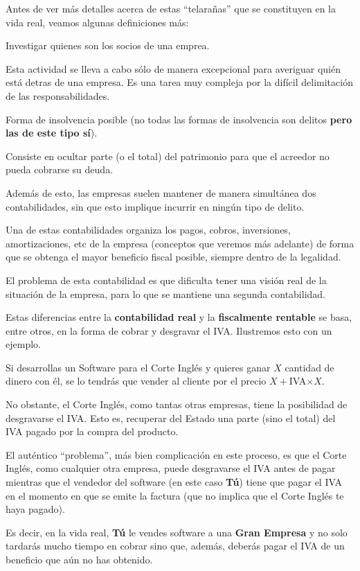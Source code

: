 \documentclass[nochap,palatino,shortheader]{apuntes}
\begin{document}
Antes de ver más detalles acerca de estas ``telarañas'' que se constituyen en la vida real, veamos algunas definiciones más:

\begin{defn}
Investigar quienes son los socios de una emprea.

Esta actividad se lleva a cabo sólo de manera excepcional para averiguar quién está detras de una empresa. Es una tarea muy compleja por la difícil delimitación de las responsabilidades.
\end{defn}

\begin{defn}
Forma de insolvencia posible (no todas las formas de insolvencia son delitos \textbf{pero las de este tipo sí}).

Consiste en ocultar parte (o el total) del patrimonio para que el acreedor no pueda cobrarse su deuda.
\end{defn}

Además de esto, las empresas suelen mantener de manera simultánea dos contabilidades, sin que esto implique incurrir en ningún tipo de delito.

Una de estas contabilidades organiza los pagos, cobros, inversiones, amortizaciones, etc de la empresa (conceptos que veremos más adelante) de forma que se obtenga el mayor beneficio fiscal posible, siempre dentro de la legalidad.

El problema de esta contabilidad es que dificulta tener una visión real de la situación de la empresa, para lo que se mantiene una segunda contabilidad.

Estas diferencias entre la \textbf{contabilidad real} y la \textbf{fiscalmente rentable} se basa, entre otros, en la forma de cobrar y desgravar el IVA. Ilustremos esto con un ejemplo.

\begin{example}
Si desarrollas un Software para el Corte Inglés y quieres ganar $X$ cantidad de dinero con él, se lo tendrás que vender al cliente por el precio $X+$IVA$\times X$.

No obstante, el Corte Inglés, como tantas otras empresas, tiene la posibilidad de desgravarse el IVA. Esto es, recuperar del Estado una parte (sino el total) del IVA pagado por la compra del producto.

El auténtico ``problema'', más bien complicación en este proceso, es que el Corte Inglés, como cualquier otra empresa, puede desgravarse el IVA antes de pagar mientras que el vendedor del software (en este caso \textbf{Tú}) tiene que pagar el IVA en el momento en que se emite la factura (que no implica que el Corte Inglés te haya pagado).

Es decir, en la vida real, \textbf{Tú} le vendes software a una \textbf{Gran Empresa} y no solo tardarás mucho tiempo en cobrar sino que, además, deberás pagar el IVA de un beneficio que aún no has obtenido.
\end{example}
\end{document}
